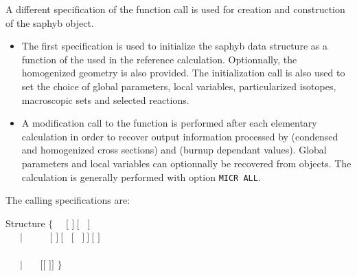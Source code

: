 A different specification of the  function call is used for
creation and construction of the {\sc saphyb} object.
\begin{itemize}
\item The first specification is used to initialize the {\sc saphyb} data structure
as a function of the  used in the reference calculation. Optionnally,
the homogenized geometry is also provided. The initialization call is also used to
set the choice of global parameters, local variables, particularized isotopes,
macroscopic sets and selected reactions.
\item A modification call to the  function is performed after each
elementary calculation in order to recover output information processed by 
(condensed and homogenized cross sections) and  (burnup dependant values).
Global parameters and local variables can optionnally be recovered from 
objects. The  calculation is generally performed with option {\tt MICR ALL}.
\end{itemize}

The calling specifications are:

\vskip -0.5cm

\begin{DataStructure}{Structure }
$\{$~~ \moc{:=}  $[$  $]~[$~ $]$ \moc{::}  \\
~~~$|$~~~ \moc{:=}  ~~$[$  $]~[$ ~$[$~ $]~]~[$  $]$\\
~~~~~~~~~~ \moc{::}  \\
~~~$|$~~~ \moc{:=}   $[[$  $]]$ \moc{::}  $\}$ \\
\end{DataStructure}

